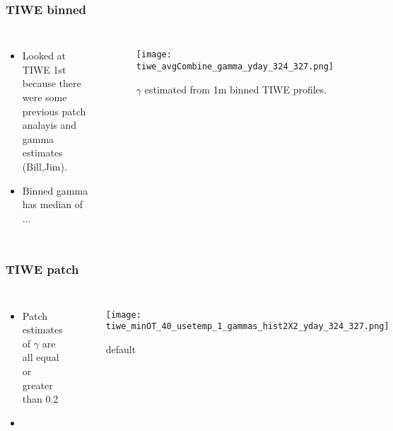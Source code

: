 \documentclass{beamer}
\begin{document}
\begin{frame}
 \frametitle{TIWE binned}

\begin{columns}
\begin{itemize}
\item Looked at TIWE 1st because there were some previous patch analayis and gamma estimates (Bill,Jim).
\item Binned gamma has median of ...
\end{itemize}

\begin{figure}[htbp]
\begin{center}
\texttt{[image: tiwe\_avgCombine\_gamma\_yday\_324\_327.png]}
\caption{$\gamma$ estimated from 1m binned TIWE profiles.}
\label{default}
\end{center}
\end{figure}

\end{columns}


\end{frame}


\begin{frame}
 \frametitle{TIWE patch}

\begin{columns}
\begin{itemize}
\item Patch estimates of $\gamma$ are all equal or greater than 0.2
\item 
\end{itemize}

\begin{figure}[htbp]
\begin{center}
\texttt{[image: tiwe\_minOT\_40\_usetemp\_1\_gammas\_hist2X2\_yday\_324\_327.png]}
\caption{default}
\label{default}
\end{center}
\end{figure}

\end{columns}


\end{frame}
\end{document}
